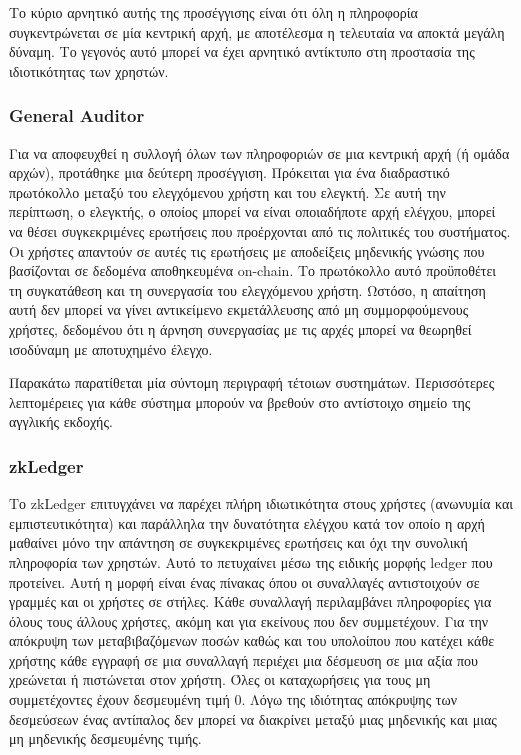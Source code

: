 Το κύριο αρνητικό αυτής της προσέγγισης είναι ότι όλη η πληροφορία συγκεντρώνεται σε μία κεντρική αρχή, με αποτέλεσμα η τελευταία να αποκτά μεγάλη δύναμη.  Το γεγονός αυτό μπορεί να έχει αρνητικό αντίκτυπο στη προστασία της ιδιοτικότητας των χρηστών.

\subsubsection{General Auditor}
Για να αποφευχθεί η συλλογή όλων των πληροφοριών σε μια κεντρική αρχή (ή ομάδα αρχών), προτάθηκε μια δεύτερη προσέγγιση. Πρόκειται για ένα διαδραστικό πρωτόκολλο μεταξύ του ελεγχόμενου χρήστη και του ελεγκτή. Σε αυτή την περίπτωση, ο ελεγκτής, ο οποίος μπορεί να είναι οποιαδήποτε αρχή ελέγχου, μπορεί να θέσει συγκεκριμένες ερωτήσεις που προέρχονται από τις πολιτικές του συστήματος. Οι χρήστες απαντούν σε αυτές τις ερωτήσεις με αποδείξεις μηδενικής γνώσης που βασίζονται σε δεδομένα αποθηκευμένα on-chain. Το πρωτόκολλο αυτό προϋποθέτει τη συγκατάθεση και τη συνεργασία του ελεγχόμενου χρήστη. Ωστόσο, η απαίτηση αυτή δεν μπορεί να γίνει αντικείμενο εκμετάλλευσης από μη συμμορφούμενους χρήστες, δεδομένου ότι η άρνηση συνεργασίας με τις αρχές μπορεί να θεωρηθεί ισοδύναμη με αποτυχημένο έλεγχο.

Παρακάτω παρατίθεται μία σύντομη περιγραφή τέτοιων συστημάτων. Περισσότερες λεπτομέρειες για κάθε σύστημα μπορούν να βρεθούν στο αντίστοιχο σημείο της αγγλικής εκδοχής.

\subsubsection{zkLedger}
Το zkLedger επιτυγχάνει να παρέχει πλήρη ιδιωτικότητα στους χρήστες (ανωνυμία και εμπιστευτικότητα) και παράλληλα την δυνατότητα ελέγχου κατά τον οποίο η αρχή μαθαίνει μόνο την απάντηση σε συγκεκριμένες ερωτήσεις και όχι την συνολική πληροφορία των χρηστών. Αυτό το πετυχαίνει μέσω της ειδικής μορφής ledger που προτείνει. Αυτή η μορφή είναι ένας πίνακας όπου οι συναλλαγές αντιστοιχούν σε γραμμές και οι χρήστες σε στήλες. Κάθε συναλλαγή περιλαμβάνει πληροφορίες για όλους τους άλλους χρήστες, ακόμη και για εκείνους που δεν συμμετέχουν. Για την απόκρυψη των μεταβιβαζόμενων ποσών καθώς και του υπολοίπου που κατέχει κάθε χρήστης κάθε εγγραφή σε μια συναλλαγή περιέχει μια δέσμευση σε μια αξία που χρεώνεται ή πιστώνεται στον χρήστη. Όλες οι καταχωρήσεις για τους μη συμμετέχοντες έχουν δεσμευμένη τιμή 0. Λόγω της ιδιότητας απόκρυψης των δεσμεύσεων ένας αντίπαλος δεν μπορεί να διακρίνει μεταξύ μιας μηδενικής και μιας μη μηδενικής δεσμευμένης τιμής. 


